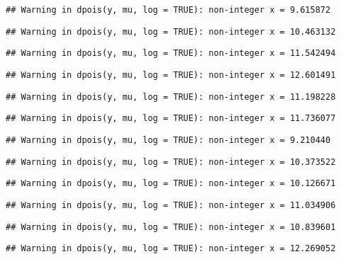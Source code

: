 \documentclass[
]{article}
\begin{document}
\begin{verbatim}
## Warning in dpois(y, mu, log = TRUE): non-integer x = 9.615872
\end{verbatim}

\begin{verbatim}
## Warning in dpois(y, mu, log = TRUE): non-integer x = 10.463132
\end{verbatim}

\begin{verbatim}
## Warning in dpois(y, mu, log = TRUE): non-integer x = 11.542494
\end{verbatim}

\begin{verbatim}
## Warning in dpois(y, mu, log = TRUE): non-integer x = 12.601491
\end{verbatim}

\begin{verbatim}
## Warning in dpois(y, mu, log = TRUE): non-integer x = 11.198228
\end{verbatim}

\begin{verbatim}
## Warning in dpois(y, mu, log = TRUE): non-integer x = 11.736077
\end{verbatim}

\begin{verbatim}
## Warning in dpois(y, mu, log = TRUE): non-integer x = 9.210440
\end{verbatim}

\begin{verbatim}
## Warning in dpois(y, mu, log = TRUE): non-integer x = 10.373522
\end{verbatim}

\begin{verbatim}
## Warning in dpois(y, mu, log = TRUE): non-integer x = 10.126671
\end{verbatim}

\begin{verbatim}
## Warning in dpois(y, mu, log = TRUE): non-integer x = 11.034906
\end{verbatim}

\begin{verbatim}
## Warning in dpois(y, mu, log = TRUE): non-integer x = 10.839601
\end{verbatim}

\begin{verbatim}
## Warning in dpois(y, mu, log = TRUE): non-integer x = 12.269052
\end{verbatim}
\end{document}
